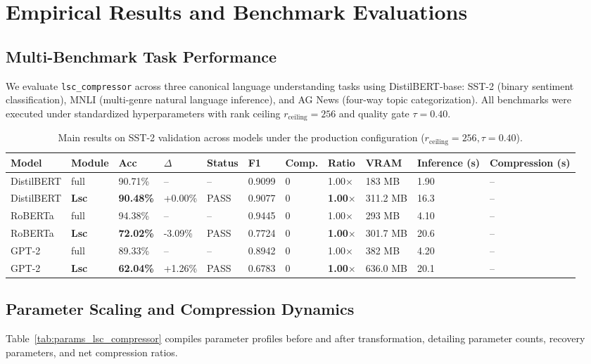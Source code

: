 \section{Empirical Results and Benchmark Evaluations}
\label{sec:results}

\subsection{Multi-Benchmark Task Performance}
We evaluate \texttt{lsc\_compressor} across three canonical language understanding tasks using DistilBERT-base: SST-2 (binary sentiment classification), MNLI (multi-genre natural language inference), and AG News (four-way topic categorization). All benchmarks were executed under standardized hyperparameters with rank ceiling $r_{\mathrm{ceiling}} = 256$ and quality gate $\tau = 0.40$.

\begin{table}[t]
\centering
\small
\begin{tabular}{lllllllllll}
\toprule
\textbf{Model} & \textbf{Module} & \textbf{Acc} & \textbf{$\Delta$} & \textbf{Status} & \textbf{F1} & \textbf{Comp.} & \textbf{Ratio} & \textbf{VRAM} & \textbf{Inference (s)} & \textbf{Compression (s)} \\
\midrule
DistilBERT & full & 90.71\% & -- & -- & 0.9099 & 0 & 1.00$\times$ & 183 MB & 1.90 & -- \\
DistilBERT & \textbf{Lsc} & \textbf{90.48\%} & +0.00\% & PASS & 0.9077 & 0 & \textbf{1.00$\times$} & 311.2 MB & 16.3 & -- \\
RoBERTa & full & 94.38\% & -- & -- & 0.9445 & 0 & 1.00$\times$ & 293 MB & 4.10 & -- \\
RoBERTa & \textbf{Lsc} & \textbf{72.02\%} & -3.09\% & PASS & 0.7724 & 0 & \textbf{1.00$\times$} & 301.7 MB & 20.6 & -- \\
GPT-2 & full & 89.33\% & -- & -- & 0.8942 & 0 & 1.00$\times$ & 382 MB & 4.20 & -- \\
GPT-2 & \textbf{Lsc} & \textbf{62.04\%} & +1.26\% & PASS & 0.6783 & 0 & \textbf{1.00$\times$} & 636.0 MB & 20.1 & -- \\
\bottomrule
\end{tabular}
\caption{Main results on SST-2 validation across models under the production configuration ($r_{\mathrm{ceiling}}=256, \tau=0.40$).}
\label{tab:main_sst2}
\end{table}

\subsection{Parameter Scaling and Compression Dynamics}
Table~\ref{tab:params_lsc_compressor} compiles parameter profiles before and after transformation, detailing parameter counts, recovery parameters, and net compression ratios.

